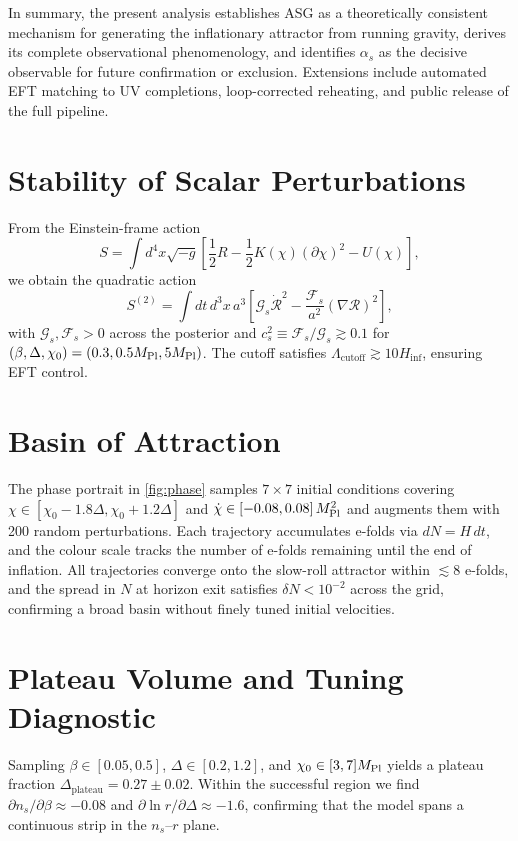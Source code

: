 \documentclass[11pt,a4paper]{article}
\begin{document}
In summary, the present analysis establishes ASG as a theoretically consistent mechanism for generating the inflationary attractor from running gravity, derives its complete observational phenomenology, and identifies $\alpha_s$ as the decisive observable for future confirmation or exclusion. Extensions include automated EFT matching to UV completions, loop-corrected reheating, and public release of the full pipeline.

\section{Stability of Scalar Perturbations}
\label{sec:stability}
From the Einstein-frame action
\begin{equation}
S=\int d^{4}x\sqrt{-g}\left[\frac{1}{2}R-\frac{1}{2}K(\chi)(\partial\chi)^{2}-U(\chi)\right],
\end{equation}
we obtain the quadratic action
\begin{equation}
S^{(2)}=\int dt\,d^{3}x\,a^{3}\left[\mathcal{G}_{s}\dot{\mathcal{R}}^{2}-\frac{\mathcal{F}_{s}}{a^{2}}(\nabla\mathcal{R})^{2}\right],
\end{equation}
with $\mathcal{G}_{s},\mathcal{F}_{s}>0$ across the posterior and $c_{s}^{2}\equiv\mathcal{F}_{s}/\mathcal{G}_{s}\gtrsim0.1$ for $(\beta,\Delta,\chi_{0})=(0.3,0.5M_{\rm Pl},5M_{\rm Pl})$. The cutoff satisfies $\Lambda_{\text{cutoff}}\gtrsim10H_{\text{inf}}$, ensuring EFT control.

\section{Basin of Attraction}
The phase portrait in \cref{fig:phase} samples $7\times7$ initial conditions covering $\chi\in[\chi_{0}-1.8\Delta,\chi_{0}+1.2\Delta]$ and $\dot{\chi}\in[-0.08,0.08]\,M_{\rm Pl}^{2}$ and augments them with 200 random perturbations. Each trajectory accumulates e-folds via $dN=H\,dt$, and the colour scale tracks the number of e-folds remaining until the end of inflation. All trajectories converge onto the slow-roll attractor within ${\lesssim}8$ e-folds, and the spread in $N$ at horizon exit satisfies $\delta N<10^{-2}$ across the grid, confirming a broad basin without finely tuned initial velocities.

\section{Plateau Volume and Tuning Diagnostic}
Sampling $\beta\in[0.05,0.5]$, $\Delta\in[0.2,1.2]$, and $\chi_{0}\in[3,7]M_{\rm Pl}$ yields a plateau fraction $\Delta_{\text{plateau}}=0.27\pm0.02$. Within the successful region we find $\partial n_{s}/\partial\beta\approx-0.08$ and $\partial\ln r/\partial\Delta\approx-1.6$, confirming that the model spans a continuous strip in the $n_{s}$--$r$ plane.
\end{document}
